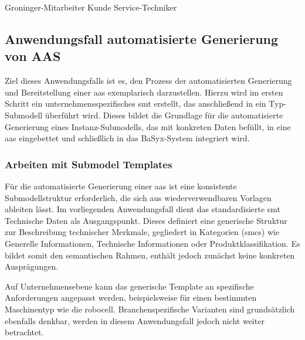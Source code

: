 Groninger-Mitarbeiter
Kunde
Service-Techniker





\newpage
\subsection{Anwendungsfall automatisierte Generierung von AAS}
Ziel dieses Anwendungsfalls ist es, den Prozess der automatisierten Generierung und Bereitstellung einer \acs{aas} exemplarisch darzustellen. 
Hierzu wird im ersten Schritt ein unternehmensspezifisches \acs{smt} erstellt, das anschließend in ein Typ-Submodell überführt wird.
Dieses bildet die Grundlage für die automatisierte Generierung eines Instanz-Submodells, das mit konkreten Daten befüllt, in eine \acs{aas} eingebettet und schließlich in das BaSyx-System integriert wird.

\subsubsection{Arbeiten mit Submodel Templates}
\label{chap:ErstellenvonSubmodelTemplates}
Für die automatisierte Generierung einer \acs{aas} ist eine konsistente Submodellstruktur erforderlich, die sich aus wiederverwendbaren Vorlagen ableiten lässt.
Im vorliegenden Anwendungsfall dient das standardisierte \acs{smt} Technische Daten \cite{SpezifikaitonTechnischeDaten} als Ausgangspunkt. 
Dieses definiert eine generische Struktur zur Beschreibung technischer Merkmale, gegliedert in Kategorien (\acsp{smc}) wie Generelle Informationen, Technische Informationen oder Produktklassifikation. 
Es bildet somit den semantischen Rahmen, enthält jedoch zunächst keine konkreten Ausprägungen.

Auf Unternehmensebene kann das generische Template an spezifische Anforderungen angepasst werden, beispielsweise für einen bestimmten Maschinentyp wie die robocell.
Branchenspezifische Varianten sind grundsätzlich ebenfalls denkbar, werden in diesem Anwendungsfall jedoch nicht weiter betrachtet.

